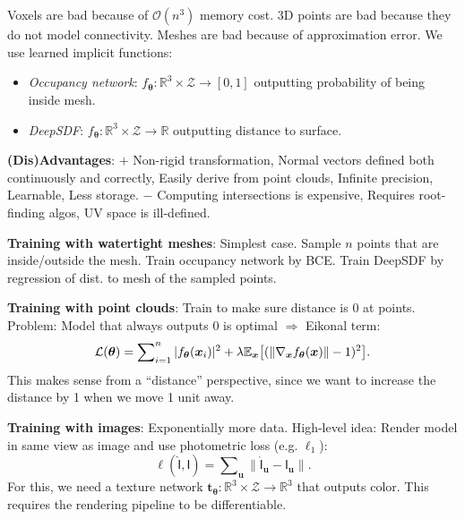 \documentclass{article}
\newcommand{\lft}{\mathopen{}\mathclose\bgroup\left}
\newcommand{\rgt}{\aftergroup\egroup\right}
\newcommand{\E}{\mathbb{E}}
\newcommand{\R}{\mathbb{R}}
\renewcommand{\vec}[1]{\bm{#1}}
\newcommand{\tens}[1]{\bm{\mathsf{#1}}}
\newenvironment{topic}[1]
{\textbf{\sffamily \colorbox{black}{\rlap{\textbf{\textcolor{white}{#1}}}\hspace{\linewidth}\hspace{-2\fboxsep}}} \\ \vspace{0.2cm}}
{}
\begin{document}
\begin{multicols*}{2}
\begin{topic}{Reinforcement learning}
    \end{topic}

    \begin{topic}{Implicit surfaces and neural radiance fields}
        Voxels are bad because of $\mathcal{O}(n^3)$ memory cost. 3D points are bad because they do not
        model connectivity. Meshes are bad because of approximation error. We use learned implicit
        functions:
        \begin{itemize}
            \item \textit{Occupancy network}: $f_{\vec{\theta}}: \R^3 \times \mathcal{Z} \to [0,1]$ outputting probability of
                  being inside mesh.
            \item \textit{DeepSDF}: $f_{\vec{\theta}}: \R^3 \times \mathcal{Z} \to \R$ outputting distance to surface.
        \end{itemize}
        \textbf{(Dis)Advantages}: $+$ Non-rigid transformation, Normal vectors defined both
        continuously and correctly, Easily derive from point clouds, Infinite precision, Learnable,
        Less storage. $-$ Computing intersections is expensive, Requires root-finding algos, UV
        space is ill-defined.

        \textbf{Training with watertight meshes}: Simplest case. Sample $n$ points that are
        inside/outside the mesh. Train occupancy network by BCE. Train DeepSDF by
        regression of dist. to mesh of the sampled points.

        \textbf{Training with point clouds}: Train to make sure distance is 0 at points. Problem:
        Model that always outputs 0 is optimal $\Rightarrow$ Eikonal term: \[
            \mathcal{L}(\vec{\theta}) = \sum\nolimits_{i=1}^{n} |f_{\vec{\theta}}(\vec{x}_i)|^2  + \lambda \E_{\vec{x}} \lft[ (\| \nabla_{\vec{x}} f_{\vec{\theta}}(\vec{x}) \| - 1)^2 \rgt].
        \]
        This makes sense from a ``distance'' perspective, since we want to increase the distance by 1 when
        we move 1 unit away.

        \textbf{Training with images}: Exponentially more data. High-level idea: Render model in same
        view as image and use photometric loss (e.g. $\ell_1$): \[
            \ell(\hat{\tens{I}}, \tens{I}) = \sum\nolimits_{\vec{u}} \| \hat{\tens{I}}_{\vec{u}} - \tens{I}_{\vec{u}} \| .
        \]
        For this, we need a texture network $\vec{t}_{\vec{\theta}}: \R^3 \times \mathcal{Z} \to \R^3$ that
        outputs color. This requires the rendering pipeline to be differentiable.


\end{topic}
\end{multicols*}
\end{document}

